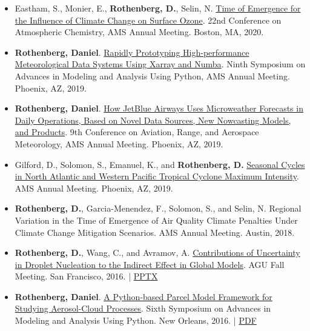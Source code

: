 \documentclass[11pt,letterpaper]{article}
\begin{document}
\begin{itemize}[itemindent=-10pt]
 \item Eastham, S., Monier, E., \textbf{Rothenberg, D.}, Selin, N. \href{https://ams.confex.com/ams/2020Annual/meetingapp.cgi/Paper/369266}{Time of Emergence for the Influence of Climate Change on Surface Ozone}. 22nd Conference on Atmospheric Chemistry, AMS Annual Meeting. Boston, MA, 2020.

 \item \textbf{Rothenberg, Daniel}. \href{https://ams.confex.com/ams/2019Annual/meetingapp.cgi/Paper/348989}{Rapidly Prototyping High-performance Meteorological Data Systems Using Xarray and Numba}. Ninth Symposium on Advances in Modeling and Analysis Using Python, AMS Annual Meeting. Phoenix, AZ, 2019.
 
 \item \textbf{Rothenberg, Daniel}. \href{https://ams.confex.com/ams/2019Annual/webprogram/Paper353057.html}{How JetBlue Airways Uses Microweather Forecasts in Daily Operations, Based on Novel Data Sources, New Nowcasting Models, and Products}. 9th Conference on Aviation, Range, and Aerospace Meteorology, AMS Annual Meeting. Phoenix, AZ, 2019.

 \item Gilford, D., Solomon, S., Emanuel, K., and \textbf{Rothenberg, D.} \href{https://ams.confex.com/ams/2019Annual/meetingapp.cgi/Paper/349989}{Seasonal Cycles in North Atlantic and Western Pacific Tropical Cyclone Maximum Intensity}. AMS Annual Meeting. Phoenix, AZ, 2019.

 \item \textbf{Rothenberg, D.}, Garcia-Menendez, F., Solomon, S., and Selin, N. Regional Variation in the Time of Emergence of Air Quality Climate Penalties Under Climate Change Mitigation Scenarios. AMS Annual Meeting. Austin, 2018.

 \item \textbf{Rothenberg, D.}, Wang, C., and Avramov, A.
 \href{https://agu.confex.com/agu/fm16/meetingapp.cgi/Paper/193282}{Contributions of Uncertainty in Droplet Nucleation to the Indirect Effect in Global Models}. AGU Fall Meeting. San Francisco, 2016. | \href{https://figshare.com/articles/Contributions_of_Uncertainty_in_Droplet_Nucleation_to_the_Indirect_Effect_in_Global_Models/4503047}{PPTX}

 \item \textbf{Rothenberg, Daniel}. \href{https://ams.confex.com/ams/96Annual/webprogram/Paper286193.html}{A Python-based Parcel Model Framework for Studying Aerosol-Cloud Processes}. Sixth Symposium on Advances in Modeling and Analysis Using Python. New Orleans, 2016. | \href{https://figshare.com/articles/A_Python-based_Parcel_Model_Framework_for_Studying_Aerosol-Cloud_Processes/3475241}{PDF}


\end{itemize}
\end{document}
